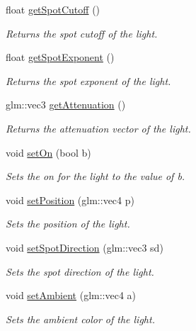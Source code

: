 \begin{DoxyCompactItemize}
\mbox{\label{class_light_aaf21d1ab9879b9d07d6ec39e29fd9cea}} 
float \hyperlink{class_light_aaf21d1ab9879b9d07d6ec39e29fd9cea}{get\+Spot\+Cutoff} ()
\begin{DoxyCompactList}\small\item\em Returns the spot cutoff of the light. \end{DoxyCompactList}\item 
\mbox{\label{class_light_a16bff83dc9d7b77352ea8ec6afb19304}} 
float \hyperlink{class_light_a16bff83dc9d7b77352ea8ec6afb19304}{get\+Spot\+Exponent} ()
\begin{DoxyCompactList}\small\item\em Returns the spot exponent of the light. \end{DoxyCompactList}\item 
\mbox{\label{class_light_a6271a08ed63869a823fbb289d02c5a2d}} 
glm\+::vec3 \hyperlink{class_light_a6271a08ed63869a823fbb289d02c5a2d}{get\+Attenuation} ()
\begin{DoxyCompactList}\small\item\em Returns the attenuation vector of the light. \end{DoxyCompactList}\item 
void \hyperlink{class_light_a8c1d5056b78362db8c8cb731642613c0}{set\+On} (bool b)
\begin{DoxyCompactList}\small\item\em Sets the on for the light to the value of b. \end{DoxyCompactList}\item 
void \hyperlink{class_light_a6c5b1c6201d6635e34ce6c452d28a82b}{set\+Position} (glm\+::vec4 p)
\begin{DoxyCompactList}\small\item\em Sets the position of the light. \end{DoxyCompactList}\item 
void \hyperlink{class_light_a87d7f0236ff86b69ffda8852c500da2c}{set\+Spot\+Direction} (glm\+::vec3 sd)
\begin{DoxyCompactList}\small\item\em Sets the spot direction of the light. \end{DoxyCompactList}\item 
void \hyperlink{class_light_a02ccb843abf2bb2047a4f9881f4aba52}{set\+Ambient} (glm\+::vec4 a)
\begin{DoxyCompactList}\small\item\em Sets the ambient color of the light. \end{DoxyCompactList}\item 

\end{DoxyCompactItemize}
